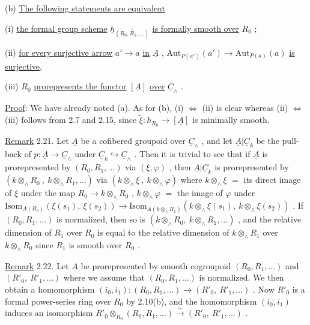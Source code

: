 (b)  \underline{The following statements are equivalent}

(i)   \underline{the formal group scheme}  $\underline{h}_{(R_0,\bar{R}_1,\dots)}$  \underline{is formally smooth over}  $R_0$  ;

(ii)  \underline{for every surjective arrow}  $a' \to a$  \underline{in}  $\underline{A}$  ,
$\mathrm{Aut}_{P(a')}(a') \longrightarrow \mathrm{Aut}_{P(a)}(a)$  \underline{is surjective},

(iii)  $R_0$  \underline{prorepresents the functor}  $[\underline{A}]$  \underline{over}  $\underline{C}_\wedge$  .



\underline{Proof}:  We have already noted (a). As for (b),  (i) $\Leftrightarrow$ (ii)  is clear whereas (ii) $\Leftrightarrow$ (iii)  follows from 2.7 and 2.15, since  $\tilde{\xi} : h_{R_0} \longrightarrow [\underline{A}]$  is minimally smooth.

\underline{Remark} 2.21.  Let  $\underline{A}$  be a cofibered groupoid over  $\underline{C}_\wedge$  , and let  $\underline{A}|\underline{C}_k$  be the pull-back of  $p : \underline{A} \longrightarrow \underline{C}_\wedge$  under  $\underline{C}_k \hookrightarrow \underline{C}_\wedge$ . Then it is trivial to see that if  $\underline{A}$  is prorepresented by  $(R_0,R_1,\dots)$  via  $(\xi,\varphi)$  , then  $\underline{A}|\underline{C}_k$  is prorepresented by  $(k \otimes_\wedge R_0\ ,\ k \otimes_\wedge R_1,\dots)$  via  $(k \otimes_\wedge \xi\ ,\ k \otimes_\wedge \varphi)$  where  $k \otimes_\wedge \xi$ $=$ its direct image of  $\xi$  under the map  $R_0 \longrightarrow k \otimes_\wedge R_0$ ,  $k \otimes_\wedge \varphi$ $=$ the image of  $\varphi$  under  $\mathrm{Isom}_{\underline{A}(R_0)}(\xi(s_1),\ \xi(s_2)) \longrightarrow \mathrm{Isom}_{\underline{A}(k \otimes_\wedge R_1)}(k \otimes_\wedge \xi(s_1),\ k \otimes_\wedge \xi(s_2))$ . If  $(R_0,R_1,\dots)$  is normalized, then so is  $(k \otimes_\wedge R_0,\ k \otimes_\wedge R_1,\dots)$  , and the relative dimension of  $R_1$  over  $R_0$  is equal to the relative dimension of  $k \otimes_\wedge R_1$  over  $k \otimes_\wedge R_0$  since  $R_1$  is smooth over  $R_0$  .

\underline{Remark} 2.22.  Let  $\underline{A}$  be prorepresented by smooth cogroupoid  $(R_0,R_1,\dots)$  and  $(R'_0,\ R'_1,\dots)$  where we assume that  $(R_0,R_1,\dots)$  is normalized. We then obtain a homomorphism  $(i_0,i_1) : (R_0,R_1,\dots) \longrightarrow (R'_0,\ R'_1,\dots)$  . Now  $R'_0$  is a formal power-series ring over  $R_0$  by 2.10(b), and the homomorphism  $(i_0,i_1)$  induces an isomorphism  $R'_0 \otimes_{R_0} (R_0,R_1,\dots) \overset{\sim}{\longrightarrow} (R'_0,\ R'_1,\dots)$  .



